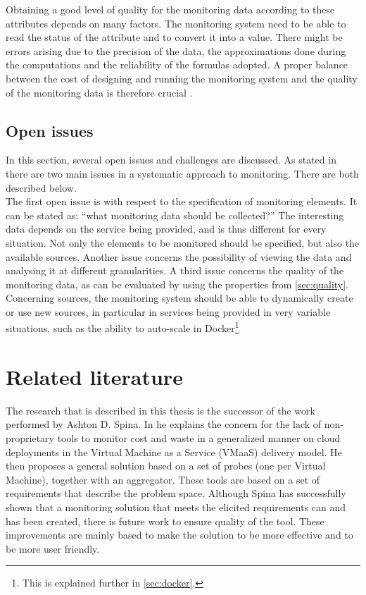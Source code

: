 \noindent
Obtaining a good level of quality for the monitoring data according to these attributes depends on many factors. The monitoring system need to be able to read the status of the attribute and to convert it into a value. There might be errors arising due to the precision of the data, the approximations done during the computations and the reliability of the formulas adopted. A proper balance between the cost of designing and running the monitoring system and the quality of the monitoring data is therefore crucial \cite{pernici2016monitoring}.

\subsection{Open issues} \label{sec:open_issues}
In this section, several open issues and challenges are discussed. As stated in \cite{pernici2016monitoring} there are two main issues in a systematic approach to monitoring. There are both described below.\\

\noindent
The first open issue is with respect to the specification of monitoring elements. It can be stated as: ``what monitoring data should be collected?'' The interesting data depends on the service being provided, and is thus different for every situation. Not only the elements to be monitored should be specified, but also the available sources. Another issue concerns the possibility of viewing the data and analysing it at different granularities. A third issue concerns the quality of the monitoring data, as can be evaluated by using the properties from \autoref{sec:quality}. Concerning sources, the monitoring system should be able to dynamically create or use new sources, in particular in services being provided in very variable situations, such as the ability to auto-scale in Docker\footnote{This is explained further in \autoref{sec:docker}.}

\section{Related literature} \label{sec:related_literature}
The research that is described in this thesis is the successor of the work performed by Ashton D. Spina. In \cite{spina} he explains the concern for the lack of non-proprietary tools to monitor cost and waste in a generalized manner on cloud deployments in the Virtual Machine as a Service (VMaaS) delivery model. He then proposes a general solution based on a set of probes (one per Virtual Machine), together with an aggregator. These tools are based on a set of requirements that describe the problem space. Although Spina has successfully shown that a monitoring solution that meets the elicited requirements can and has been created, there is future work to ensure quality of the tool. These improvements are mainly based to make the solution to be more effective and to be more user friendly.\\

